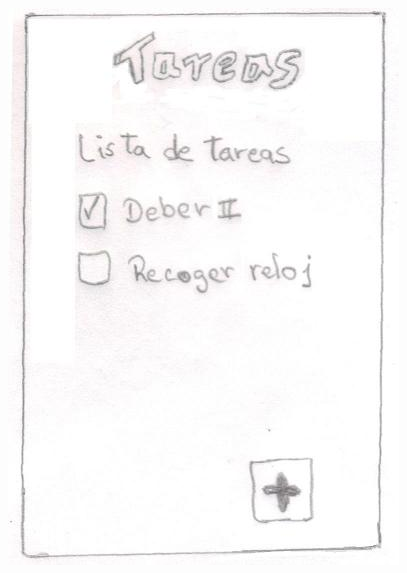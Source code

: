 \documentclass[12pt]{article}
\begin{document}
\begin{figure}[h]
\centering
\vspace{0.3in}\includegraphics[scale=0.5]{Twin5}
\end{figure}

\end{document}
